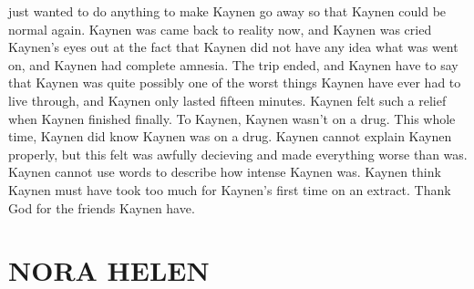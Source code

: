 \documentclass[12pt]{book}
\begin{document}
just wanted to do anything to make Kaynen go away so that Kaynen could be normal again. Kaynen was came back to reality now, and Kaynen was cried Kaynen's eyes out at the fact that Kaynen did not have any idea what was went on, and Kaynen had complete amnesia. The trip ended, and Kaynen have to say that Kaynen was quite possibly one of the worst things Kaynen have ever had to live through, and Kaynen only lasted fifteen minutes. Kaynen felt such a relief when Kaynen finished finally. To Kaynen, Kaynen wasn't on a drug. This whole time, Kaynen did know Kaynen was on a drug. Kaynen cannot explain Kaynen properly, but this felt was awfully decieving and made everything worse than was. Kaynen cannot use words to describe how intense Kaynen was. Kaynen think Kaynen must have took too much for Kaynen's first time on an extract. Thank God for the friends Kaynen have.






\chapter{NORA HELEN}
\end{document}
